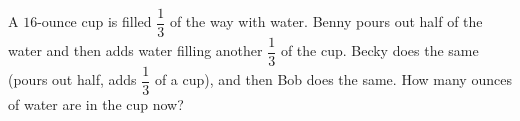A \(16\)-ounce cup is filled \(\dfrac{1}{3}\) of the way with water. Benny pours out half of the water and then adds water filling another \(\dfrac{1}{3}\) of the cup. Becky does the same (pours out half, adds \(\dfrac{1}{3}\) of a cup), and then Bob does the same. How many ounces of water are in the cup now?
